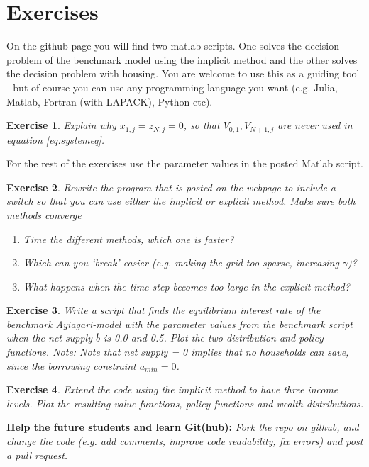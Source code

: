\documentclass[12pt]{article}
\DeclareMathOperator{\1}{\mathbbm{1}}
\newtheorem{exercise}{Exercise}
\begin{document}
\section*{Exercises}
On the github page you will find two matlab scripts. One solves the decision problem of the benchmark model using the implicit method and the other solves the decision problem with housing. You are welcome to use this as a guiding tool - but of course you can use any programming language you want (e.g. Julia, Matlab, Fortran (with LAPACK), Python etc).

\begin{exercise}
Explain why $x_{1,j}=z_{N,j}=0$, so that $V_{0,1},V_{N+1,j}$ are never used in equation \eqref{eq:systemeq}.  
\end{exercise}

For the rest of the exercises use the parameter values in the posted Matlab script.
\begin{exercise}
Rewrite the program that is posted on the webpage to include a switch so that you can use either the implicit or explicit method. Make sure both methods converge

\begin{enumerate} 
\item Time the different methods, which one is faster? 
\item Which can you `break' easier (e.g. making the grid too sparse, increasing $\gamma$)? 
\item What happens when the time-step becomes too large in the explicit method?
\end{enumerate}
\end{exercise}

\begin{exercise}
Write a script that finds the equilibrium interest rate of the benchmark Ayiagari-model with the parameter values from the benchmark script when the net supply $\bar b$ is 0.0 and 0.5. Plot the two distribution and policy functions. \textit{Note:} Note that net supply = 0 implies that no households can save, since the borrowing constraint $a_{min}=0$.
\end{exercise}

\begin{exercise}
Extend the code using the implicit method to have three income levels. Plot the resulting value functions, policy functions and wealth distributions.
\end{exercise}

\textbf{Help the future students and learn Git(hub):} \textit{Fork the repo on github, and change the code (e.g. add comments, improve code readability, fix errors) and post a pull request.}
\end{document}
